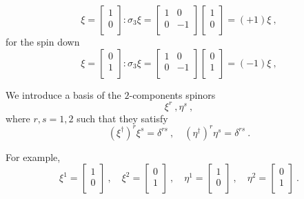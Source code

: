     \begin{equation*}
        \xi = \begin{bmatrix}
            1 \\ 0 \\
        \end{bmatrix} \colon \sigma_3 \xi = \begin{bmatrix}
            1 & 0 \\ 0 & -1 \\
        \end{bmatrix} \begin{bmatrix}
            1 \\ 0 \\
        \end{bmatrix} = (+1) \xi ~,
    \end{equation*}
    for the spin down
    \begin{equation*}
        \xi = \begin{bmatrix}
            0 \\ 1 \\
        \end{bmatrix} \colon \sigma_3 \xi = \begin{bmatrix}
            1 & 0 \\ 0 & -1 \\
        \end{bmatrix} \begin{bmatrix}
            0 \\ 1 \\
        \end{bmatrix} = (-1) \xi ~,
    \end{equation*}

    We introduce a basis of the $2$-components spinors 
    \begin{equation*}
        \xi^r ~, \eta^s ~,
    \end{equation*}
    where $r,s = 1,2$ such that they satisfy 
    \begin{equation*}
        (\xi^\dagger)^r \xi^s = \delta^{rs} ~, \quad (\eta^\dagger)^r \eta^s = \delta^{rs}  ~.
    \end{equation*}

    For example, 
    \begin{equation*}
        \xi^1 = \begin{bmatrix}
            1 \\ 0 \\
        \end{bmatrix} ~, \quad \xi^2 = \begin{bmatrix}
            0 \\ 1 \\
        \end{bmatrix} ~, \quad \eta^1 = \begin{bmatrix}
            1 \\ 0 \\
        \end{bmatrix} ~, \quad \eta^2 = \begin{bmatrix}
            0 \\ 1 \\
        \end{bmatrix} ~.
    \end{equation*}

